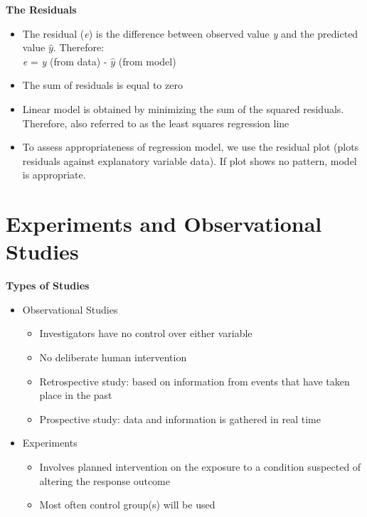 \documentclass{article}
\begin{document}
\noindent
\textbf{The Residuals}
\begin{itemize}
    \item The residual (\emph{e}) is the difference between observed value \emph{y} and the predicted value \begin{math}
    \hat{y}
    \end{math}. Therefore:\\
    \emph{e} = \emph{y} (from data) - \begin{math}
    \hat{y}
    \end{math} (from model)
    \item The sum of residuals is equal to zero
    \item Linear model is obtained by minimizing the sum of the squared residuals. Therefore, also referred to as the least squares regression line
    \item To assess appropriateness of regression model, we use the residual plot (plots residuals against explanatory variable data). If plot shows no pattern, model is appropriate. 
\end{itemize}

\section{Experiments and Observational Studies}

\textbf{Types of Studies}
\begin{itemize}
    \item Observational Studies
    \begin{itemize}
        \item Investigators have no control over either variable
        \item No deliberate human intervention 
        \item Retrospective study: based on information from events that have taken place in the past
        \item Prospective study: data and information is gathered in real time
    \end{itemize}
    \item Experiments 
    \begin{itemize}
        \item Involves planned intervention on the exposure to a condition suspected of altering the response outcome
        \item Most often control group(s) will be used
    \end{itemize}
\end{itemize}
\end{document}
